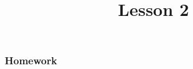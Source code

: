 \documentclass[10pt,a4paper,oneside]{book}
\title{Lesson 2}
\author{}
\date{}
\begin{document}
\maketitle



\subsubsection*{Homework}

\begin{enumerate}
    
\end{enumerate}
\end{document}

